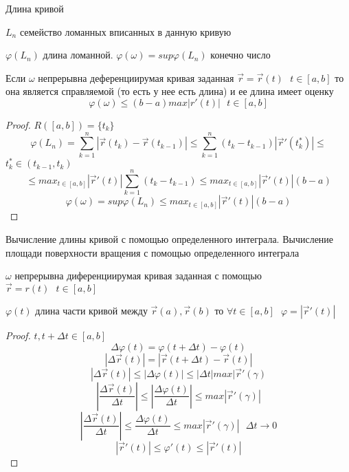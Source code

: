 \begin{title}[\Large]
  Длина кривой
\end{title}

$L_n$ семейство ломанных вписанных в данную кривую

$\varphi (L_n)$ длина ломанной. $\varphi (\omega) = sup \varphi (L_n)$ конечно
число

\begin{theorem}
  Если $\omega$ непрерывна деференциирумая кривая заданная
  $\vec r = \vec r (t) ~~~ t \in [a,b]$ то она является справляемой
  (то есть у нее есть длина) и ее длина имеет оценку
  $$
  \varphi (\omega) \le (b-a) max |r'(t)| ~~~ t \in [a,b]
  $$
\end{theorem}

\begin{proof}
  $
  R([a,b]) = \{t_k\}
  $
  $$
  \varphi (L_n) = \sum_{k=1}^n |\vec r (t_k) - \vec r (t_{k-1})| \le
  \sum_{k=1}^n (t_k - t_{k-1}) |\vec r' (t_k^*)| \le
  $$
  $t_k^* \in (t_{k-1}, t_k)$
  $$
  \le max_{t \in [a,b]} |\vec r' (t)| \sum_{k=1}^n (t_k - t_{k-1}) \le
  max_{t \in [a,b]} |\vec r' (t)| (b-a)
  $$
  $$
  \varphi (\omega) = sup \varphi (L_n) \le max_{t \in [a,b]} |\vec r' (t)|(b-a)
  $$
\end{proof}

\begin{title}[\Large]
  Вычисление длины кривой с помощью определенного интеграла. Вычисление площади
  поверхности вращения с помощью определенного интеграла
\end{title}

\begin{theorem}
  $\omega$  непрерывна диференциирумая кривая заданная с помощью
  $\vec r = r(t) ~~~ t \in [a,b]$

  $\varphi (t)$ длина части кривой между $\vec r(a), \vec r(b)$ то
  $\forall t \in [a,b] ~~~ \varphi = |\vec r'(t)|$
\end{theorem}

\begin{proof}
  $t, t+\Delta t \in [a,b]$
  $$
  \Delta \varphi (t) = \varphi( t+\Delta t) - \varphi(t)
  $$
  $$
  |\Delta \vec r(t) | = |\vec r(t+\Delta t) - \vec r(t)|
  $$
  $$
  |\Delta \vec r(t)| \le |\Delta \varphi (t)| \le
  |\Delta t| max | \vec r'(\gamma)
  $$
  $$
  \left| \frac{\Delta \vec r(t)}{\Delta t} \right| \le
  \left| \frac{\Delta \varphi (t)}{\Delta t} \right| \le
  max |\vec r'(\gamma)|
  $$
  $$
  \left| \frac{\Delta \vec r(t)}{\Delta t} \right| \le
  \frac{\Delta \varphi (t)}{\Delta t} \le
  max |\vec r'(\gamma)| ~~~ \Delta t \to 0
  $$
  $$
  |\vec r'(t)| \le \varphi'(t) \le |\vec r'(t)|
  $$
\end{proof}

